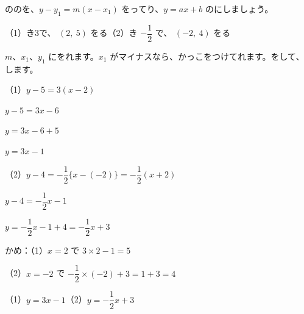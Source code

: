 \begin{reidai}
ののを、$y-y_1=m(x-x_1)$ をってり、$y=ax+b$ のにしましょう。\par
（1）\nobreak {}き3で、 $(2,\ 5)$ をる\qquad（2）\nobreak {}き $-\dfrac{1}{2}$ で、 $(-2,\ 4)$ をる\par
\kangaekata $m$、$x_1$、$y_1$ にをれます。$x_1$ がマイナスなら、かっこをつけてれます。をして、します。\par
\shiki\par
\noindent\begin{minipage}[t]{0.42\linewidth}
（1）\nobreak $y-5=3(x-2)$\par
\hspace*{2\zw}$y-5=3x-6$\par
\hspace*{2\zw}$y=3x-6+5$\par
\hspace*{2\zw}$y=3x-1$
\end{minipage}\hfill
\begin{minipage}[t]{0.56\linewidth}
（2）\nobreak $y-4=-\dfrac{1}{2}\{x-(-2)\}=-\dfrac{1}{2}(x+2)$\par
\hspace*{2\zw}$y-4=-\dfrac{1}{2}x-1$\par
\hspace*{2\zw}$y=-\dfrac{1}{2}x-1+4=-\dfrac{1}{2}x+3$
\end{minipage}\par
{}かめ：（1）\nobreak $x=2$ で $3\times2-1=5$\par
\hspace*{5\zw}（2）\nobreak $x=-2$ で $-\dfrac{1}{2}\times(-2)+3=1+3=4$\par
\kotae（1）\nobreak $y=3x-1$\quad（2）\nobreak $y=-\dfrac{1}{2}x+3$
\end{reidai}

